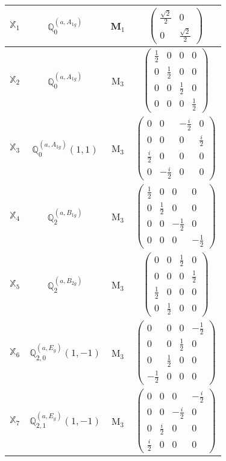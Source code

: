\documentclass[fleqn,10pt,landscape]{article}
\begin{document}
\begin{itemize}
\begin{center}
\begin{longtable}{c|c|c|c}
$ \mathbb{X}_{1} $ & $\mathbb{Q}_{0}^{(a,A_{1g})}$ & M$_{1}$ & $\begin{pmatrix} \frac{\sqrt{2}}{2} & 0 \\ 0 & \frac{\sqrt{2}}{2} \end{pmatrix}$ \\ \hline
$ \mathbb{X}_{2} $ & $\mathbb{Q}_{0}^{(a,A_{1g})}$ & M$_{3}$ & $\begin{pmatrix} \frac{1}{2} & 0 & 0 & 0 \\ 0 & \frac{1}{2} & 0 & 0 \\ 0 & 0 & \frac{1}{2} & 0 \\ 0 & 0 & 0 & \frac{1}{2} \end{pmatrix}$ \\
$ \mathbb{X}_{3} $ & $\mathbb{Q}_{0}^{(a,A_{1g})}(1,1)$ & M$_{3}$ & $\begin{pmatrix} 0 & 0 & - \frac{i}{2} & 0 \\ 0 & 0 & 0 & \frac{i}{2} \\ \frac{i}{2} & 0 & 0 & 0 \\ 0 & - \frac{i}{2} & 0 & 0 \end{pmatrix}$ \\
$ \mathbb{X}_{4} $ & $\mathbb{Q}_{2}^{(a,B_{1g})}$ & M$_{3}$ & $\begin{pmatrix} \frac{1}{2} & 0 & 0 & 0 \\ 0 & \frac{1}{2} & 0 & 0 \\ 0 & 0 & - \frac{1}{2} & 0 \\ 0 & 0 & 0 & - \frac{1}{2} \end{pmatrix}$ \\
$ \mathbb{X}_{5} $ & $\mathbb{Q}_{2}^{(a,B_{2g})}$ & M$_{3}$ & $\begin{pmatrix} 0 & 0 & \frac{1}{2} & 0 \\ 0 & 0 & 0 & \frac{1}{2} \\ \frac{1}{2} & 0 & 0 & 0 \\ 0 & \frac{1}{2} & 0 & 0 \end{pmatrix}$ \\
$ \mathbb{X}_{6} $ & $\mathbb{Q}_{2,0}^{(a,E_{g})}(1,-1)$ & M$_{3}$ & $\begin{pmatrix} 0 & 0 & 0 & - \frac{1}{2} \\ 0 & 0 & \frac{1}{2} & 0 \\ 0 & \frac{1}{2} & 0 & 0 \\ - \frac{1}{2} & 0 & 0 & 0 \end{pmatrix}$ \\
$ \mathbb{X}_{7} $ & $\mathbb{Q}_{2,1}^{(a,E_{g})}(1,-1)$ & M$_{3}$ & $\begin{pmatrix} 0 & 0 & 0 & - \frac{i}{2} \\ 0 & 0 & - \frac{i}{2} & 0 \\ 0 & \frac{i}{2} & 0 & 0 \\ \frac{i}{2} & 0 & 0 & 0 \end{pmatrix}$ \\

\end{longtable}
\end{center}
\end{itemize}
\end{document}
